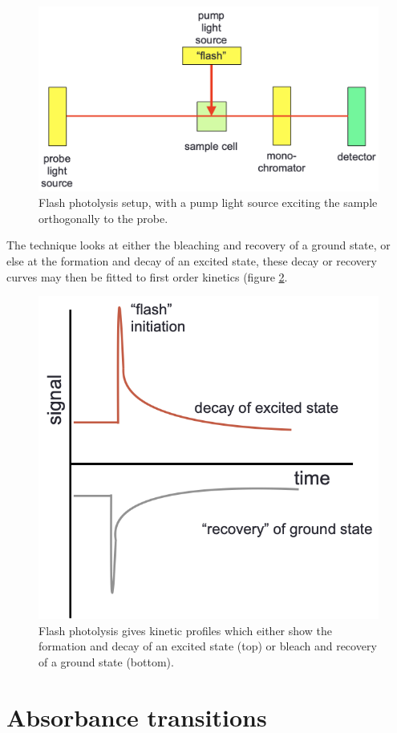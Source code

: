 \documentclass[
]{book}
\begin{document}
\begin{figure}

{\centering \includegraphics[width=0.6\linewidth]{images/flash} 

}

\caption{Flash photolysis setup, with a pump light source exciting the sample orthogonally to the probe.}\label{fig:flash}
\end{figure}

The technique looks at either the bleaching and recovery of a ground state, or else at the formation and decay of an excited state, these decay or recovery curves may then be fitted to first order kinetics (figure \ref{fig:flashdecay}.

\begin{figure}

{\centering \includegraphics[width=0.6\linewidth]{images/flashdecay} 

}

\caption{Flash photolysis gives kinetic profiles which either show the formation and decay of an excited state (top) or bleach and recovery of a ground state (bottom).}\label{fig:flashdecay}
\end{figure}

\hypertarget{absorbance-transitions}{%
\section{Absorbance transitions}\label{absorbance-transitions}}
\end{document}
